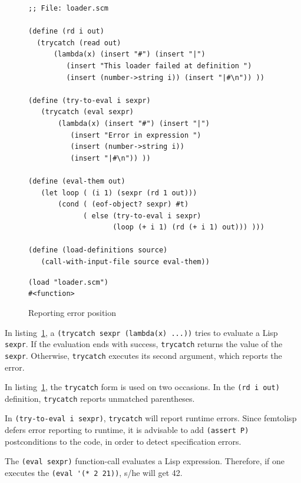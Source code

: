 \documentclass[a4paper,12pt]{book}
\newenvironment{fmpage}[1]
               {\begin{lrbox}{\fmbox}\begin{minipage}{#1}}
               {\end{minipage}\end{lrbox}\fbox{\usebox{\fmbox}}}
\begin{document}
\begin{figure}[!h]
\begin{fmpage}{0.9\textwidth}
\begin{verbatim}
;; File: loader.scm

(define (rd i out)
  (trycatch (read out) 
      (lambda(x) (insert "#") (insert "|")
         (insert "This loader failed at definition ")
         (insert (number->string i)) (insert "|#\n")) ))

(define (try-to-eval i sexpr)
   (trycatch (eval sexpr)
       (lambda(x) (insert "#") (insert "|")
          (insert "Error in expression ")
          (insert (number->string i))
          (insert "|#\n")) ))

(define (eval-them out)
   (let loop ( (i 1) (sexpr (rd 1 out)))
       (cond ( (eof-object? sexpr) #t)
             ( else (try-to-eval i sexpr)
                    (loop (+ i 1) (rd (+ i 1) out))) )))

(define (load-definitions source)
   (call-with-input-file source eval-them))
\end{verbatim}
\end{fmpage}

\begin{fmpage}{0.9\textwidth}
  \verb|(load "loader.scm")|\\
  \verb|#<function>|\\
\end{fmpage}
\caption{Reporting error position}
\label{error-position}
\end{figure}

In listing~\ref{error-position},
a \verb|(trycatch sexpr (lambda(x) ...))|
tries to evaluate a Lisp \verb|sexpr|.
If the evaluation
ends with success, \verb|trycatch|
returns the value of the \verb|sexpr|.
Otherwise,
\verb|trycatch| executes its second
argument, which reports the error.

In listing~\ref{error-position},
the \verb|trycatch| form is used on
two occasions. In the \verb|(rd i out)|
definition, \verb|trycatch| reports
unmatched parentheses.

In \verb|(try-to-eval i sexpr)|,
\verb|trycatch| will report runtime
errors. Since femtolisp defers
error reporting to runtime, it is
advisable to add \verb|(assert P)|
postconditions to the code, in
order to detect specification
errors.

The \verb|(eval sexpr)| function-call
evaluates a Lisp expression. Therefore,
if one executes the \verb|(eval '(* 2 21))|,
s/he  will get 42.
\end{document}
